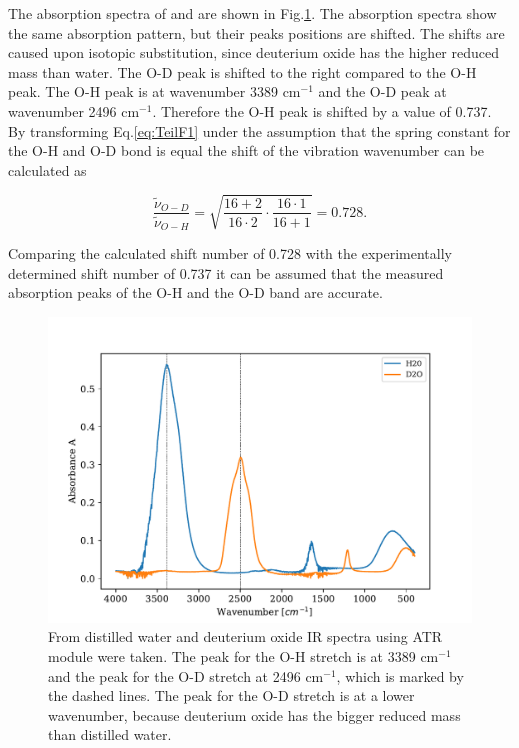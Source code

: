 \documentclass[a4paper,abstracton]{article}	                       %
\begin{document}
The absorption spectra of  and  are shown in Fig.\ref{fig:TeilF}. The absorption spectra show the same absorption pattern, but their peaks positions are shifted. The shifts are caused upon isotopic substitution, since deuterium oxide has the higher reduced mass than water. The O-D peak is shifted to the right compared to the O-H peak. The O-H peak is at wavenumber 3389 cm$^{-1}$ and the O-D peak at wavenumber 2496 cm$^{-1}$. Therefore the O-H peak is shifted by a value of 0.737. By transforming Eq.\ref{eq:TeilF1} under the assumption that the spring constant for the O-H and O-D bond is equal the shift of the vibration wavenumber can be calculated as

\begin{equation}\label{eq:F2}
   {\frac{\tilde{\nu}_{O-D}}{\tilde{\nu}_{O-H}}} = \sqrt{\frac{16 + 2}{16 \cdot 2} \cdot \frac{16 \cdot 1}{16 + 1}} = 0.728.
\end{equation}

Comparing the calculated shift number of 0.728 with the experimentally determined shift number of 0.737 it can be assumed that the measured absorption peaks of the O-H and the O-D band are accurate. 

\begin{figure}[H]
\centering
 \includegraphics[width=\textwidth] {TeilF.pdf}
\caption{\label{fig:TeilF}From distilled water and deuterium oxide IR spectra using ATR module were taken. The peak for the O-H stretch is at 3389 cm$^{-1}$ and the peak for the O-D stretch at 2496 cm$^{-1}$, which is marked by the dashed lines. The peak for the O-D stretch is at a lower wavenumber, because deuterium oxide has the bigger reduced mass than distilled water.}
\end{figure}
\clearpage
\end{document}
